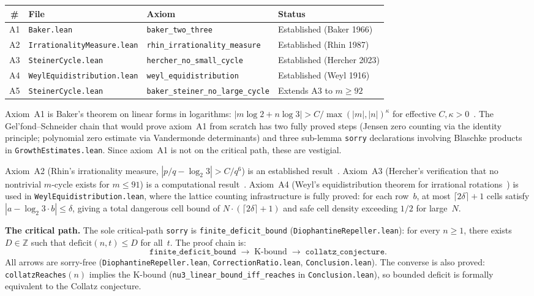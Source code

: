 \documentclass[manuscript]{aomart}
\newcommand{\Z}{\mathbb{Z}}
\theoremstyle{plain}
\theoremstyle{definition}
\theoremstyle{remark}
\numberwithin{equation}{section}
\begin{document}
\begin{center}
\renewcommand{\arraystretch}{1.3}
\begin{tabular}{clll}
  \toprule
  \textbf{\#} & \textbf{File} & \textbf{Axiom} & \textbf{Status} \\
  \midrule
  A1 & \texttt{Baker.lean} &
    \texttt{baker\_two\_three} &
    Established (Baker 1966) \\
  A2 & \texttt{IrrationalityMeasure.lean} &
    \texttt{rhin\_irrationality\_measure} &
    Established (Rhin 1987) \\
  A3 & \texttt{SteinerCycle.lean} &
    \texttt{hercher\_no\_small\_cycle} &
    Established (Hercher 2023) \\
  A4 & \texttt{WeylEquidistribution.lean} &
    \texttt{weyl\_equidistribution} &
    Established (Weyl 1916) \\
  A5 & \texttt{SteinerCycle.lean} &
    \texttt{baker\_steiner\_no\_large\_cycle} &
    Extends A3 to $m \ge 92$ \\
  \bottomrule
\end{tabular}
\end{center}

Axiom~A1 is Baker's theorem on linear forms in logarithms: $|m \log 2
+ n \log 3| > C / \max(|m|, |n|)^{\kappa}$ for effective $C, \kappa >
0$~\cite{Baker1966}.  The Gel'fond--Schneider chain that would prove
axiom~A1 from scratch has two fully proved steps (Jensen zero counting
via the identity principle; polynomial zero estimate via Vandermonde
determinants) and three sub-lemma \texttt{sorry} declarations involving
Blaschke products in \texttt{GrowthEstimates.lean}.  Since axiom~A1 is
not on the critical path, these are vestigial.

Axiom~A2 (Rhin's irrationality measure, $|p/q - \log_2 3| >
C/q^6$) is an established result~\cite{Rhin1987}.
Axiom~A3 (Hercher's verification that no nontrivial $m$-cycle exists
for $m \le 91$) is a computational result~\cite{Hercher2024}.
Axiom~A4 (Weyl's equidistribution theorem for irrational
rotations~\cite{Weyl1916}) is used in
\texttt{WeylEquidistribution.lean}, where the lattice counting
infrastructure is fully proved: for each row~$b$, at most
$\lceil 2\delta \rceil + 1$ cells satisfy $|a - \log_2 3 \cdot b| \le
\delta$, giving a total dangerous cell bound of
$N \cdot (\lceil 2\delta \rceil + 1)$ and safe cell density
exceeding $1/2$ for large~$N$.

\medskip\noindent\textbf{The critical path.}
The sole critical-path \texttt{sorry} is
\texttt{finite\_deficit\_bound} (\texttt{DiophantineRepeller.lean}):
for every $n \ge 1$, there exists $D \in \Z$ such that
$\mathrm{deficit}(n, t) \le D$ for all~$t$.
The proof chain is:
\[
  \texttt{finite\_deficit\_bound} \;\to\;
  \text{K-bound} \;\to\;
  \texttt{collatz\_conjecture}.
\]
All arrows are sorry-free (\texttt{DiophantineRepeller.lean},
\texttt{CorrectionRatio.lean}, \texttt{Conclusion.lean}).
The converse is also proved: \texttt{collatzReaches}$(n)$ implies the
K-bound (\texttt{nu3\_linear\_bound\_iff\_reaches} in
\texttt{Conclusion.lean}), so bounded deficit is formally equivalent
to the Collatz conjecture.
\end{document}
